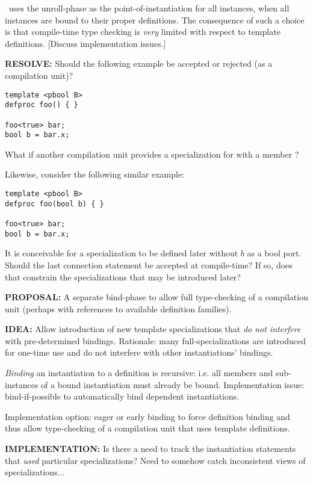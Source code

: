 \hac\ uses the unroll-phase as the point-of-instantiation for all 
instances, when all instances are bound to their proper definitions.  
The consequence of such a choice is that compile-time type checking
is \emph{very} limited with respect to template definitions.  
[Discuss implementation issues.]

\textbf{RESOLVE:}
Should the following example be accepted or rejected (as a compilation unit)?

\begin{verbatim}
template <pbool B>
defproc foo() { }

foo<true> bar;
bool b = bar.x;
\end{verbatim}

What if another compilation unit provides a specialization for 
 with a  member ?

Likewise, consider the following similar example:

\begin{verbatim}
template <pbool B>
defproc foo(bool b) { }

foo<true> bar;
bool b = bar.x;
\end{verbatim}

It is conceivable for a specialization to be defined later without
$b$ as a bool port.  
Should the last connection statement be accepted at compile-time?
If so, does that constrain the specializations that may be introduced later?


\textbf{PROPOSAL:}
A separate bind-phase to allow full type-checking of a compilation unit
(perhaps with references to available definition families).  

\textbf{IDEA:}
Allow introduction of new template specializations that
\emph{do not interfere} with pre-determined bindings.  
Rationale: many full-specializations are introduced for one-time use and
do not interfere with other instantiations' bindings.  

\emph{Binding} an instantiation to a definition is recursive: i.e.
all members and sub-instances of a bound instantiation must already be bound.  
Implementation issue: bind-if-possible to automatically bind dependent
instantiations.  

Implementation option: eager or early binding to force 
definition binding and thus allow type-checking of a 
compilation unit that uses template definitions.  

\textbf{IMPLEMENTATION:}
Is there a need to track the instantiation statements that \emph{used}
particular specializations?  Need to somehow catch inconsistent views
of specializations...

